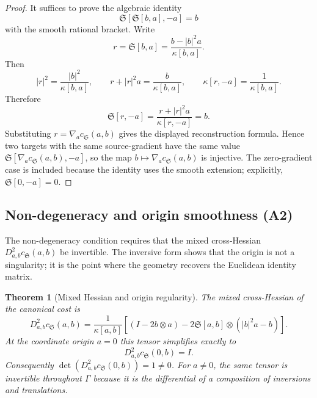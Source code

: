 \documentclass[11pt]{article}
\newtheorem{theorem}{Theorem}[section]
\newcommand{\norm}[1]{\left|#1\right|}
\newcommand{\cs}{c_{\mathfrak S}}
\newcommand{\grad}{\nabla}
\newcommand{\Sbr}[2]{\mathfrak S[#1,#2]}
\newcommand{\kap}[2]{\kappa[#1,#2]}
\begin{document}
\begin{proof}
It suffices to prove the algebraic identity
\[
    \Sbr{\Sbr{b}{a}}{-a}=b
\]
with the smooth rational bracket.  Write
\[
    r=\Sbr{b}{a}=\frac{b-\norm b^2a}{\kap{b}{a}}.
\]
Then
\[
    \norm r^2=\frac{\norm b^2}{\kap{b}{a}},
    \qquad
    r+\norm r^2a=\frac{b}{\kap{b}{a}},
    \qquad
    \kap{r}{-a}=\frac{1}{\kap{b}{a}}.
\]
Therefore
\[
    \Sbr{r}{-a}
    =
    \frac{r+\norm r^2a}{\kap{r}{-a}}
    =
    b.
\]
Substituting $r=\grad_a\cs(a,b)$ gives the displayed reconstruction formula.  Hence two targets with the same source-gradient have the same value $\Sbr{\grad_a\cs(a,b)}{-a}$, so the map $b\mapsto\grad_a\cs(a,b)$ is injective.  The zero-gradient case is included because the identity uses the smooth extension; explicitly, $\Sbr{0}{-a}=0$.
\end{proof}

\subsection{Non-degeneracy and origin smoothness (A2)}

The non-degeneracy condition requires that the mixed cross-Hessian $D^2_{a,b}\cs(a,b)$ be invertible.  The inversive form shows that the origin is not a singularity; it is the point where the geometry recovers the Euclidean identity matrix.

\begin{theorem}[Mixed Hessian and origin regularity]
The mixed cross-Hessian of the canonical cost is
\[
    \boxed{
    D^2_{a,b}\cs(a,b)
    =
    \frac{1}{\kap{a}{b}}
    \left[
        \left(I-2b\otimes a\right)
        -2\Sbr{a}{b}\otimes\left(\norm b^2a-b\right)
    \right].
    }
\]
At the coordinate origin $a=0$ this tensor simplifies exactly to
\[
    \boxed{
    D^2_{a,b}\cs(0,b)=I.
    }
\]
Consequently $\det(D^2_{a,b}\cs(0,b))=1\neq0$.  For $a\neq0$, the same tensor is invertible throughout $\Gamma$ because it is the differential of a composition of inversions and translations.
\end{theorem}
\end{document}
